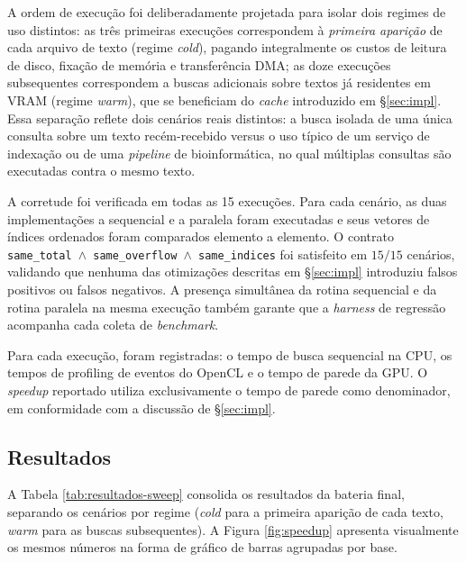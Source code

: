 \documentclass[12pt]{article}
\begin{document}
A ordem de execução foi deliberadamente projetada para isolar dois regimes de uso distintos: as três primeiras execuções correspondem à \textit{primeira aparição} de cada arquivo de texto (regime \textit{cold}), pagando integralmente os custos de leitura de disco, fixação de memória e transferência DMA; as doze execuções subsequentes correspondem a buscas adicionais sobre textos já residentes em VRAM (regime \textit{warm}), que se beneficiam do \textit{cache} introduzido em \S\ref{sec:impl}. Essa separação reflete dois cenários reais distintos: a busca isolada de uma única consulta sobre um texto recém-recebido versus o uso típico de um serviço de indexação ou de uma \textit{pipeline} de bioinformática, no qual múltiplas consultas são executadas contra o mesmo texto.

A corretude foi verificada em todas as 15 execuções. Para cada cenário, as duas implementações  a sequencial e a paralela foram executadas e seus vetores de índices ordenados foram comparados elemento a elemento. O contrato \texttt{same\_total~$\wedge$~same\_overflow~$\wedge$~same\_indices} foi satisfeito em $15/15$ cenários, validando que nenhuma das otimizações descritas em \S\ref{sec:impl} introduziu falsos positivos ou falsos negativos. A presença simultânea da rotina sequencial e da rotina paralela na mesma execução também garante que a \textit{harness} de regressão acompanha cada coleta de \textit{benchmark}.

Para cada execução, foram registradas: o tempo de busca sequencial na CPU, os tempos de profiling de eventos do OpenCL e o tempo de parede da GPU. O \textit{speedup} reportado utiliza exclusivamente o tempo de parede como denominador, em conformidade com a discussão de \S\ref{sec:impl}.

\subsection{Resultados}
\label{sec:resultados-tab}

A Tabela \ref{tab:resultados-sweep} consolida os resultados da bateria final, separando os cenários por regime (\textit{cold} para a primeira aparição de cada texto, \textit{warm} para as buscas subsequentes). A Figura \ref{fig:speedup} apresenta visualmente os mesmos números na forma de gráfico de barras agrupadas por base.
\end{document}
